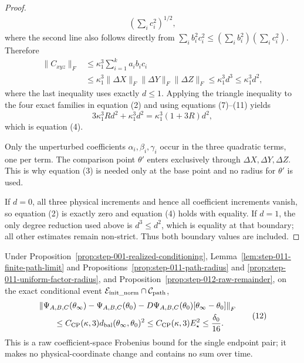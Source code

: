 \begin{proof}
\[\begin{aligned}
       \left(\sum_i c_i^2\right)^{1/2},
\end{aligned}\tag{10}
\]
where the second line also follows directly from
\(\sum_i b_i^2c_i^2\le(\sum_i b_i^2)(\sum_i c_i^2)\).
Therefore
\[
\begin{aligned}
  \|C_{xyz}\|_F
  &\le\kappa_1^3\sum_{i=1}^k a_ib_ic_i\\
  &\le\kappa_1^3
       \|\Delta X\|_F\|\Delta Y\|_F\|\Delta Z\|_F
   \le\kappa_1^3d^3
   \le\kappa_1^3d^2,
\end{aligned}\tag{11}
\]
where the last inequality uses exactly \(d\le1\). Applying the triangle
inequality to the four exact families in equation (2) and using
equations (7)--(11) yields
\[
  3\kappa_1^3Rd^2+\kappa_1^3d^2
  =\kappa_1^3(1+3R)d^2,
\]
which is equation (4).

Only the unperturbed coefficients \(\alpha_i,\beta_i,\gamma_i\) occur in
the three quadratic terms, one per term. The comparison point
\(\theta'\) enters exclusively through \(\Delta X,\Delta Y,\Delta Z\).
This is why equation (3) is needed only at the base point and no radius for
\(\theta'\) is used.

If \(d=0\), all three physical increments and hence all coefficient
increments vanish, so equation (2) is exactly zero and equation (4) holds
with equality. If \(d=1\), the only degree reduction used above is
\(d^3\le d^2\), which is equality at that boundary; all other estimates
remain non-strict. Thus both boundary values are included. 

\end{proof}


\begin{proposition}
\label{prop:step-012-endpoint-remainder}
Under Proposition~\ref{prop:step-001-realized-conditioning},
Lemma~\ref{lem:step-011-finite-path-limit} and
Propositions~\ref{prop:step-011-path-radius} and
\ref{prop:step-011-uniform-factor-radius}, and
Proposition~\ref{prop:step-012-raw-remainder}, on the exact conditional event
\(\mathcal E_{\rm init\_norm}\cap\mathcal C_{\rm path}\),
\[
\begin{aligned}
  &\left\|\Psi_{A,B,C}(\theta_\infty)
      -\Psi_{A,B,C}(\theta_0)
      -D\Psi_{A,B,C}(\theta_0)[\theta_\infty-\theta_0]
    \right\|_F\\
  &\qquad\le C_{\rm CP}(\kappa,3)
      d_{\rm bal}(\theta_\infty,\theta_0)^2
   \le C_{\rm CP}(\kappa,3)E_\star^2
   \le\frac{\delta_0}{16}.
\end{aligned}\tag{12}
\]
This is a raw coefficient-space Frobenius bound for the single endpoint
pair; it makes no physical-coordinate change and contains no sum over time.

\end{proposition}

